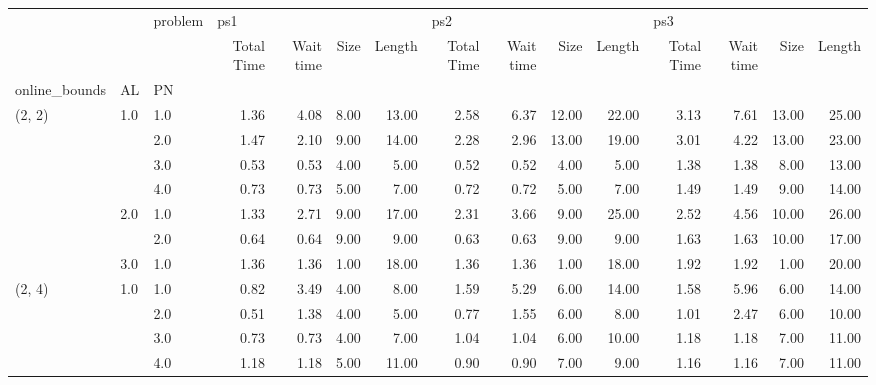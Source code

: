 \begin{tabular}{lllrrrrrrrrrrrr}
\toprule
       &     & problem & \multicolumn{4}{l}{ps1} & \multicolumn{4}{l}{ps2} & \multicolumn{4}{l}{ps3} \\
       &     & {} & Total Time & Wait time & Size & Length & Total Time & Wait time &  Size & Length & Total Time & Wait time &  Size & Length \\
online\_bounds & AL & PN &            &           &      &        &            &           &       &        &            &           &       &        \\
\midrule
(2, 2) & 1.0 & 1.0  &       1.36 &      4.08 & 8.00 &  13.00 &       2.58 &      6.37 & 12.00 &  22.00 &       3.13 &      7.61 & 13.00 &  25.00 \\
       &     & 2.0  &       1.47 &      2.10 & 9.00 &  14.00 &       2.28 &      2.96 & 13.00 &  19.00 &       3.01 &      4.22 & 13.00 &  23.00 \\
       &     & 3.0  &       0.53 &      0.53 & 4.00 &   5.00 &       0.52 &      0.52 &  4.00 &   5.00 &       1.38 &      1.38 &  8.00 &  13.00 \\
       &     & 4.0  &       0.73 &      0.73 & 5.00 &   7.00 &       0.72 &      0.72 &  5.00 &   7.00 &       1.49 &      1.49 &  9.00 &  14.00 \\
       & 2.0 & 1.0  &       1.33 &      2.71 & 9.00 &  17.00 &       2.31 &      3.66 &  9.00 &  25.00 &       2.52 &      4.56 & 10.00 &  26.00 \\
       &     & 2.0  &       0.64 &      0.64 & 9.00 &   9.00 &       0.63 &      0.63 &  9.00 &   9.00 &       1.63 &      1.63 & 10.00 &  17.00 \\
       & 3.0 & 1.0  &       1.36 &      1.36 & 1.00 &  18.00 &       1.36 &      1.36 &  1.00 &  18.00 &       1.92 &      1.92 &  1.00 &  20.00 \\
(2, 4) & 1.0 & 1.0  &       0.82 &      3.49 & 4.00 &   8.00 &       1.59 &      5.29 &  6.00 &  14.00 &       1.58 &      5.96 &  6.00 &  14.00 \\
       &     & 2.0  &       0.51 &      1.38 & 4.00 &   5.00 &       0.77 &      1.55 &  6.00 &   8.00 &       1.01 &      2.47 &  6.00 &  10.00 \\
       &     & 3.0  &       0.73 &      0.73 & 4.00 &   7.00 &       1.04 &      1.04 &  6.00 &  10.00 &       1.18 &      1.18 &  7.00 &  11.00 \\
       &     & 4.0  &       1.18 &      1.18 & 5.00 &  11.00 &       0.90 &      0.90 &  7.00 &   9.00 &       1.16 &      1.16 &  7.00 &  11.00 \\

\end{tabular}
